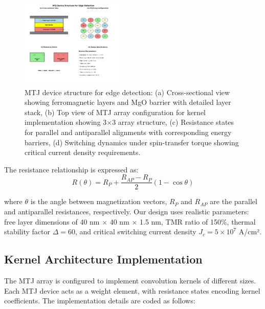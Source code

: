 \documentclass[conference]{IEEEtran}
\begin{document}
\begin{figure}[htbp]
\centerline{\includegraphics[width=0.45\textwidth]{device_schematic.png}}
\caption{MTJ device structure for edge detection: (a) Cross-sectional view showing ferromagnetic layers and MgO barrier with detailed layer stack, (b) Top view of MTJ array configuration for kernel implementation showing 3×3 array structure, (c) Resistance states for parallel and antiparallel alignments with corresponding energy barriers, (d) Switching dynamics under spin-transfer torque showing critical current density requirements.}
\label{fig:device_design}
\end{figure}

The resistance relationship is expressed as:
\begin{equation}
R(\theta) = R_P + \frac{R_{AP} - R_P}{2}(1 - \cos\theta)
\label{eq:resistance}
\end{equation}

where $\theta$ is the angle between magnetization vectors, $R_P$ and $R_{AP}$ are the parallel and antiparallel resistances, respectively. Our design uses realistic parameters: free layer dimensions of 40 nm × 40 nm × 1.5 nm, TMR ratio of 150\%, thermal stability factor $\Delta = 60$, and critical switching current density $J_c = 5 \times 10^7$ A/cm².

\subsection{Kernel Architecture Implementation}

The MTJ array is configured to implement convolution kernels of different sizes. Each MTJ device acts as a weight element, with resistance states encoding kernel coefficients. The implementation details are coded as follows:
\end{document}
